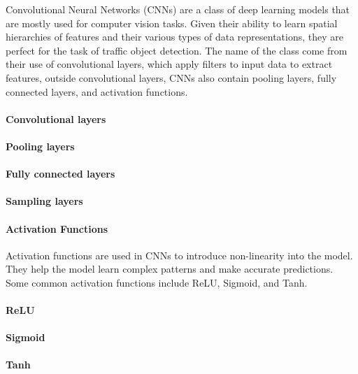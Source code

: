 \documentclass[11pt,a4paper,twoside,openright]{report}  %
\begin{document}
Convolutional Neural Networks (CNNs) are a class of deep learning models that are mostly used for computer vision tasks.
Given their ability to learn spatial hierarchies of features and their various types of data representations,
they are perfect for the task of traffic object detection.
The name of the class come from their use of convolutional layers, which apply filters to input data to extract features, outside
convolutional layers, CNNs also contain pooling layers, fully connected layers, and activation functions.

\paragraph{Convolutional layers}\label{par:convolutional-layers}


\paragraph{Pooling layers}\label{par:pooling-layers}


\paragraph{Fully connected layers}\label{par:fully-connected-layers}


\paragraph{Sampling layers}\label{par:sampling-layers}

\paragraph{Activation Functions}\label{par:activation-functions}
Activation functions are used in CNNs to introduce non-linearity into the model.
They help the model learn complex patterns and make accurate predictions.
Some common activation functions include ReLU, Sigmoid, and Tanh.

\paragraph{ReLU}\label{par:relu}


\paragraph{Sigmoid}\label{par:sigmoid}


\paragraph{Tanh}\label{par:tanh}
\end{document}
